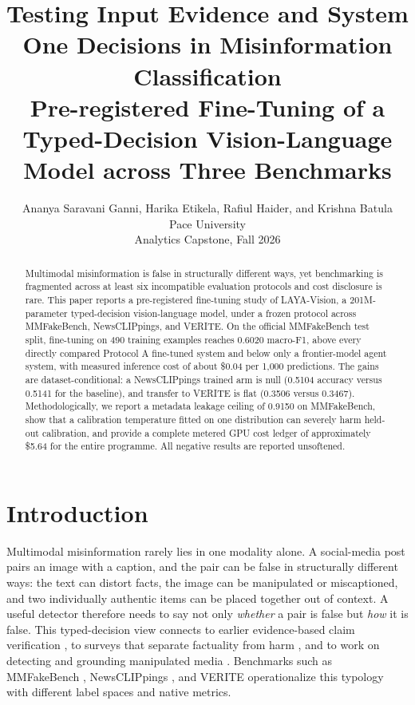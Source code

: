 \documentclass{article} %
\title{Testing Input Evidence and System One Decisions in Misinformation Classification\\[2pt] \large Pre-registered Fine-Tuning of a Typed-Decision Vision-Language Model across Three Benchmarks}
\author{Ananya Saravani Ganni, Harika Etikela, Rafiul Haider, and Krishna Batula\\
Pace University\\
Analytics Capstone, Fall 2026
}
\begin{document}
\maketitle

\begin{abstract}
Multimodal misinformation is false in structurally different ways, yet benchmarking is fragmented across at least six incompatible evaluation protocols and cost disclosure is rare. This paper reports a pre-registered fine-tuning study of LAYA-Vision, a 201M-parameter typed-decision vision-language model, under a frozen protocol across MMFakeBench, NewsCLIPpings, and VERITE. On the official MMFakeBench test split, fine-tuning on 490 training examples reaches 0.6020 macro-F1, above every directly compared Protocol A fine-tuned system and below only a frontier-model agent system, with measured inference cost of about \$0.04 per 1,000 predictions. The gains are dataset-conditional: a NewsCLIPpings trained arm is null (0.5104 accuracy versus 0.5141 for the baseline), and transfer to VERITE is flat (0.3506 versus 0.3467). Methodologically, we report a metadata leakage ceiling of 0.9150 on MMFakeBench, show that a calibration temperature fitted on one distribution can severely harm held-out calibration, and provide a complete metered GPU cost ledger of approximately \$5.64 for the entire programme. All negative results are reported unsoftened.
\end{abstract}

\section{Introduction}
\label{sec:intro}
Multimodal misinformation rarely lies in one modality alone. A social-media post pairs an image with a caption, and the pair can be false in structurally different ways: the text can distort facts, the image can be manipulated or miscaptioned, and two individually authentic items can be placed together out of context. A useful detector therefore needs to say not only \emph{whether} a pair is false but \emph{how} it is false. This typed-decision view connects to earlier evidence-based claim verification \citep{Thorne2018FeverLargescale, Augenstein2019MultifcRealworld, Guo2021SurveyAutomated}, to surveys that separate factuality from harm \citep{Alam2021SurveyMultimodal}, and to work on detecting and grounding manipulated media \citep{Shao2023DetectingGrounding}. Benchmarks such as MMFakeBench \citep{Liu2024MmfakebenchMixedsource}, NewsCLIPpings \citep{Luo2021NewsclippingsAutomatic}, and VERITE \citep{Papadopoulos2023VeriteRobust} operationalize this typology with different label spaces and native metrics.
\end{document}
